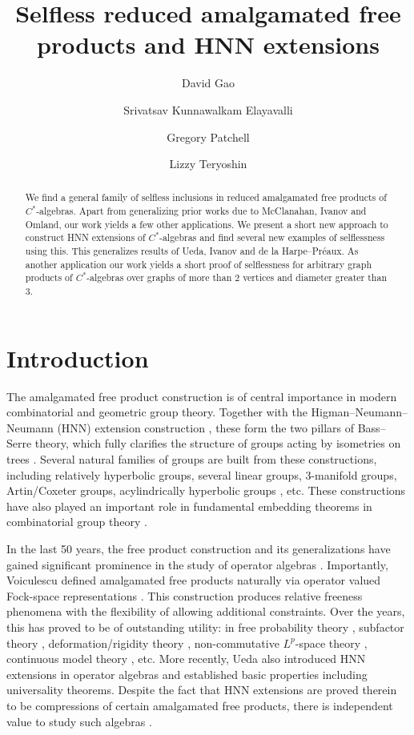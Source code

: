 \documentclass{amsart}
\title{Selfless reduced amalgamated free products and HNN extensions}
\author[D. Gao]{David Gao}
\author[S. Kunnawalkam Elayavalli]{Srivatsav Kunnawalkam Elayavalli}
\author[G. Patchell]{Gregory Patchell}
\author[L. Teryoshin]{Lizzy Teryoshin}
\theoremstyle{definition}
\begin{document}
\begin{abstract}
We find a general family of selfless inclusions in reduced amalgamated free products of $C^*$-algebras. Apart from generalizing prior works due to McClanahan, Ivanov and Omland, our work yields a few other applications. We present a short new approach to construct HNN extensions of $C^*$-algebras and find several new examples of selflessness using this. This generalizes results of Ueda, Ivanov and de la Harpe--Pr\'{e}aux. As another application our work yields a short proof of selflessness for arbitrary graph products of $C^*$-algebras over graphs of more than 2 vertices and diameter greater than 3.

\end{abstract}
	\maketitle





\section{Introduction}

The amalgamated free product construction is of central importance in modern combinatorial and geometric group theory. Together with the Higman--Neumann--Neumann (HNN) extension construction \cite{HNNpaper}, these form the two pillars of Bass--Serre theory, which fully clarifies the structure of groups acting by isometries on trees \cite{Ser80}. Several natural families of groups are built from these constructions, including relatively hyperbolic groups, several linear groups, 3-manifold groups, Artin/Coxeter groups, acylindrically hyperbolic groups \cite{MO15}, etc. These constructions have also played an important role in fundamental embedding theorems in combinatorial group theory \cite{higman1961subgroups}. 

 In the last 50 years, the free product construction and its generalizations have gained significant prominence in the study of operator algebras \cite{voiculescu1992free}. Importantly, Voiculescu defined amalgamated free products naturally via operator valued Fock-space representations \cite{voiculescu1985symmetries}. This construction produces relative freeness phenomena with the flexibility of allowing additional constraints. Over the years, this has proved to be of outstanding utility: in free probability theory \cite{speicher1998combinatorial}, subfactor theory \cite{Popa1993}, deformation/rigidity theory \cite{IPP08, CartanAFP}, non-commutative $L^p$-space theory \cite{KhinRX, mei}, continuous model theory \cite{exoticCIKE}, etc. More recently, Ueda also introduced HNN extensions in operator algebras \cite{Ueda2005HNN, Ueda2008Remarks} and established basic properties including universality theorems. Despite the fact that HNN extensions are proved therein to be compressions of certain amalgamated free products, there is independent value to study such algebras \cite{fima2012hnn, gao2025conjugacy}. 
\end{document}
